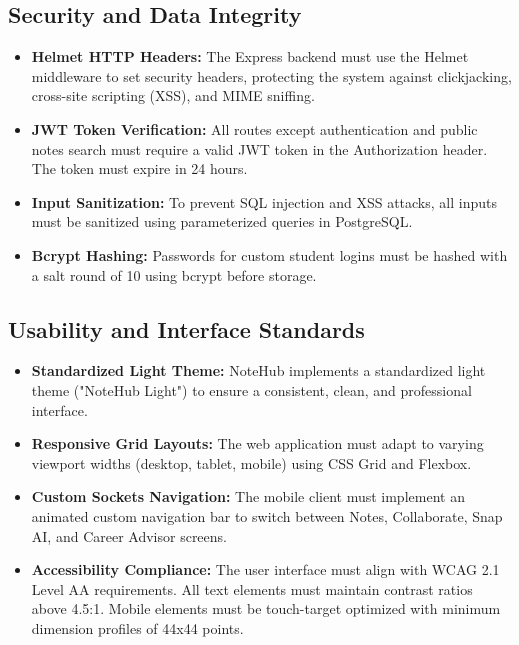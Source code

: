 \documentclass[12,Times new Roman,a4paper]{report}
\begin{document}
\subsection{Security and Data Integrity}
\begin{itemize}
    \item \textbf{Helmet HTTP Headers:} The Express backend must use the Helmet middleware to set security headers, protecting the system against clickjacking, cross-site scripting (XSS), and MIME sniffing.
    \item \textbf{JWT Token Verification:} All routes except authentication and public notes search must require a valid JWT token in the Authorization header. The token must expire in 24 hours.
    \item \textbf{Input Sanitization:} To prevent SQL injection and XSS attacks, all inputs must be sanitized using parameterized queries in PostgreSQL.
    \item \textbf{Bcrypt Hashing:} Passwords for custom student logins must be hashed with a salt round of 10 using bcrypt before storage.
\end{itemize}

\subsection{Usability and Interface Standards}
\begin{itemize}
    \item \textbf{Standardized Light Theme:} NoteHub implements a standardized light theme ("NoteHub Light") to ensure a consistent, clean, and professional interface.
    \item \textbf{Responsive Grid Layouts:} The web application must adapt to varying viewport widths (desktop, tablet, mobile) using CSS Grid and Flexbox.
    \item \textbf{Custom Sockets Navigation:} The mobile client must implement an animated custom navigation bar to switch between Notes, Collaborate, Snap AI, and Career Advisor screens.
    \item \textbf{Accessibility Compliance:} The user interface must align with WCAG 2.1 Level AA requirements. All text elements must maintain contrast ratios above 4.5:1. Mobile elements must be touch-target optimized with minimum dimension profiles of 44x44 points.
\end{itemize}
\end{document}
